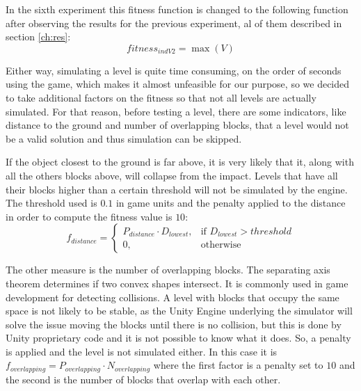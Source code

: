 \documentclass[a4paper,twoside]{article}
\begin{document}
In the sixth experiment this fitness function is changed to the
following function after observing the results for the previous
experiment, al of them described in section \ref{ch:res}: 
$$fitness_{indV2} = \max{(V)}$$


Either way, simulating a level is quite time consuming, on the order of
seconds using the game, which makes it almost unfeasible for our purpose, so we
decided to take additional factors on the fitness so that not all
levels are actually simulated. 
For that reason, before testing a level, there are some indicators, like
distance to the ground and number of overlapping blocks, that a level would 
not be a valid solution
and thus simulation can be skipped.

If the object closest to the ground is far above, it is very likely that
it, along with all the others blocks above, 
will collapse from the impact. Levels that have all their blocks higher than a 
certain threshold will not be simulated by the engine. The threshold used is 
$0.1$ in game units and the penalty applied to the distance in order
to compute the fitness value is $10$:
$$f_{distance} = 
\begin{cases}
P_{distance}\cdot D_{lowest}, & \text{if } D_{lowest} > threshold\\
0, & \text{otherwise}
\end{cases}
$$

The other measure is the number of overlapping blocks. The separating axis 
theorem \cite{ericson2004real} determines if two convex shapes intersect. It is 
commonly used in game development for detecting collisions. A level with blocks 
that occupy the same space is not likely to be stable, as the Unity
Engine underlying the simulator will solve the issue moving the blocks
until there is no collision, but this is done by Unity proprietary
code and it is not possible to know what it does. 
So, a penalty is applied and the level is not simulated either. 
In this case it is $f_{overlapping} = P_{overlapping} \cdot N_{overlapping}$ 
where the first factor is a penalty set to $10$ and the second is the number of 
blocks that overlap with each other.
\end{document}
